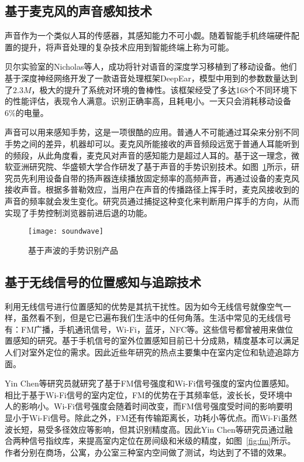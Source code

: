 \subsection{基于麦克风的声音感知技术}
声音作为一个类似人耳的传感器，其感知能力不可小觑。随着智能手机终端硬件配置的提升，将声音处理的复杂技术应用到智能终端上称为可能。

贝尔实验室的Nicholas等人，成功将针对语音的深度学习移植到了移动设备。他们基于深度神经网络开发了一款语音处理框架DeepEar，模型中用到的参数数量达到了$2.3 M$，极大的提升了系统对环境的鲁棒性。该框架经受了多达168个不同环境下的性能评估，表现令人满意。识别正确率高，且耗电小。一天只会消耗移动设备6\%的电量。

声音可以用来感知手势，这是一项很酷的应用。普通人不可能通过耳朵来分别不同手势之间的差异，机器却可以。麦克风所能接收的声音频段远宽于普通人耳能听到的频段，从此角度看，麦克风对声音的感知能力是超过人耳的。基于这一理念，微软亚洲研究院、华盛顿大学合作研发了基于声音的手势识别技术。如图~\ref{fig:soundwave}所示，研究员先利用设备自带的扬声器连续播放固定频率的高频声音，再通过设备的麦克风接收声音。根据多普勒效应，当用户在声音的传播路径上挥手时，麦克风接收到的声音的频率就会发生变化。研究员通过捕捉这种变化来判断用户挥手的方向，从而实现了手势控制浏览器前进后退的功能。
\begin{figure}[htbp] %
  \centering
  \texttt{[image: soundwave]}
  \caption{基于声波的手势识别产品}
  \label{fig:soundwave}
\end{figure}

\subsection{基于无线信号的位置感知与追踪技术}
利用无线信号进行位置感知的优势是其抗干扰性。因为如今无线信号就像空气一样，虽然看不到，但是它已遍布我们生活中的任何角落。生活中常见的无线信号有：FM广播，手机通讯信号，Wi-Fi，蓝牙，NFC等。这些信号都曾被用来做位置感知的研究。基于手机信号的室外位置感知目前已十分成熟，精度基本可以满足人们对室外定位的需求。因此近些年研究的热点主要集中在室内定位和轨迹追踪方面。

Yin Chen等研究员就研究了基于FM信号强度和Wi-Fi信号强度的室内位置感知。相比于基于Wi-Fi信号的室内定位，FM的优势在于其频率低，波长长，受环境中人的影响小。Wi-Fi信号强度会随着时间改变，而FM信号强度受时间的影响要明显小于Wi-Fi信号。除此之外，FM还有传输距离长，功耗小等优点。而Wi-Fi虽然波长短，易受多径效应等影响，但其识别精度高。因此Yin Chen等研究员通过融合两种信号指纹库，来提高室内定位在房间级和米级的精度，如图~\ref{fig:fm}所示。作者分别在商场，公寓，办公室三种室内空间做了测试，均达到了不错的效果。

